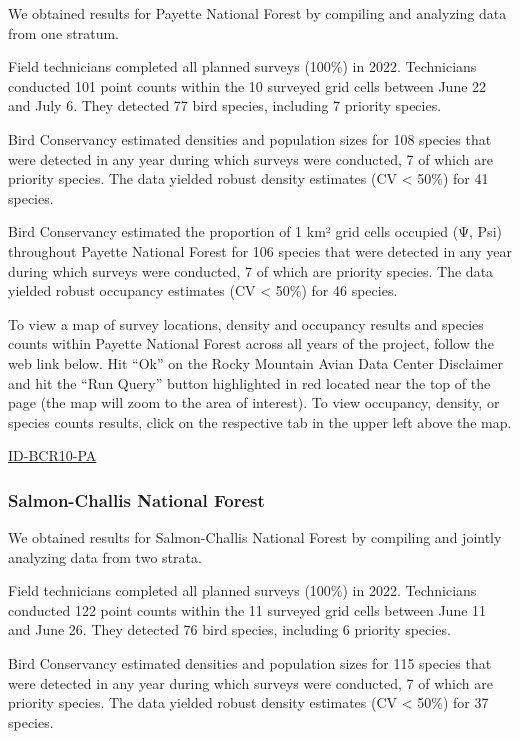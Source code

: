 \documentclass[
  letterpaper,
  DIV=11,
  numbers=noendperiod,
  oneside]{scrreprt}
\begin{document}
We obtained results for Payette National Forest by compiling and
analyzing data from one stratum.

Field technicians completed all planned surveys (100\%) in 2022.
Technicians conducted 101 point counts within the 10 surveyed grid cells
between June 22 and July 6. They detected 77 bird species, including 7
priority species.

Bird Conservancy estimated densities and population sizes for 108
species that were detected in any year during which surveys were
conducted, 7 of which are priority species. The data yielded robust
density estimates (CV \textless{} 50\%) for 41 species.

Bird Conservancy estimated the proportion of 1 km² grid cells occupied
(Ψ, Psi) throughout Payette National Forest for 106 species that were
detected in any year during which surveys were conducted, 7 of which are
priority species. The data yielded robust occupancy estimates (CV
\textless{} 50\%) for 46 species.

To view a map of survey locations, density and occupancy results and
species counts within Payette National Forest across all years of the
project, follow the web link below. Hit ``Ok'' on the Rocky Mountain
Avian Data Center Disclaimer and hit the ``Run Query'' button
highlighted in red located near the top of the page (the map will zoom
to the area of interest). To view occupancy, density, or species counts
results, click on the respective tab in the upper left above the map.

\href{http://www.rmbo.org/new_site/adc/QueryWindow.aspx\#N4IgzgLgTghhCuBbEAuABCAkgEQLQCEBhAJQEYAGXABQEF0qYBPAUwgmbQDk4BLAewB2MADZoAYnyjNIIAL5A===}{ID-BCR10-PA}

\hypertarget{salmon-challis-national-forest}{%
\subsubsection{Salmon-Challis National
Forest}\label{salmon-challis-national-forest}}

We obtained results for Salmon-Challis National Forest by compiling and
jointly analyzing data from two strata.

Field technicians completed all planned surveys (100\%) in 2022.
Technicians conducted 122 point counts within the 11 surveyed grid cells
between June 11 and June 26. They detected 76 bird species, including 6
priority species.

Bird Conservancy estimated densities and population sizes for 115
species that were detected in any year during which surveys were
conducted, 7 of which are priority species. The data yielded robust
density estimates (CV \textless{} 50\%) for 37 species.
\end{document}
